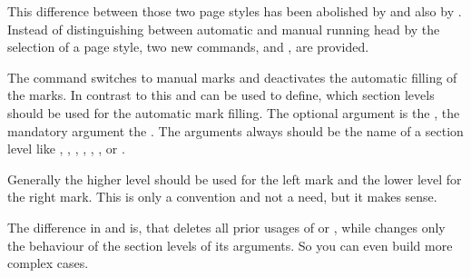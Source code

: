 This difference between those two page styles has been abolished by
 and also by . Instead of distinguishing
between automatic and manual running head by the selection of a page style,
two new commands,  and , are provided. 

The command  switches to manual marks and deactivates the
automatic filling of the marks. In contrast to this  and
 can be used to define, which section levels should be used
for the automatic mark filling. The optional argument is the , the mandatory argument the . The arguments always should be the name of a section level
like , , , ,
, , or .

Generally the higher level should be used for the left mark and the lower
level for the right mark. This is only a convention and not a need, but it
makes sense.

The difference in  and  is, that
 deletes all prior usages of  or
, while  changes only the behaviour of the
section levels of its arguments. So you can even build more complex cases.

